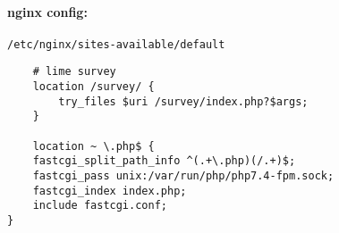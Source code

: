 \documentclass{article}
\begin{document}
\paragraph{nginx config:} 

\verb|/etc/nginx/sites-available/default|

\begin{verbatim}
    # lime survey
    location /survey/ {
        try_files $uri /survey/index.php?$args;
    }

    location ~ \.php$ {                                                                                                  
    fastcgi_split_path_info ^(.+\.php)(/.+)$;                                                                        
    fastcgi_pass unix:/var/run/php/php7.4-fpm.sock;                                                                  
    fastcgi_index index.php;                                                                                         
    include fastcgi.conf;                                                                                            
}        
\end{verbatim}
\end{document}
